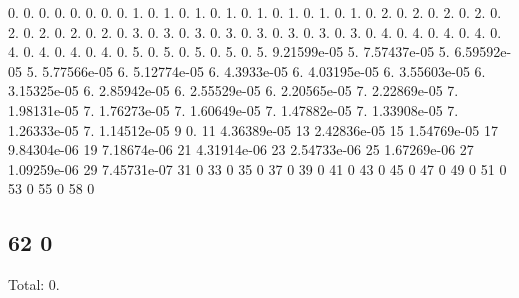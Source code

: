 0. 0. 0. 0. 0. 0. 0. 0. 1. 0. 1. 0. 1. 0. 1. 0. 1. 0. 1. 0. 1. 0. 1. 0. 2. 0. 2. 0. 2. 0. 2. 0. 2. 0. 2. 0. 2. 0. 2. 0. 3. 0. 3. 0. 3. 0. 3. 0. 3. 0. 3. 0. 3. 0. 3. 0. 4. 0. 4. 0. 4. 0. 4. 0. 4. 0. 4. 0. 4. 0. 4. 0. 5. 0. 5. 0. 5. 0. 5. 0. 5. 9.\+21599e-\/05 5. 7.\+57437e-\/05 5. 6.\+59592e-\/05 5. 5.\+77566e-\/05 6. 5.\+12774e-\/05 6. 4.\+3933e-\/05 6. 4.\+03195e-\/05 6. 3.\+55603e-\/05 6. 3.\+15325e-\/05 6. 2.\+85942e-\/05 6. 2.\+55529e-\/05 6. 2.\+20565e-\/05 7. 2.\+22869e-\/05 7. 1.\+98131e-\/05 7. 1.\+76273e-\/05 7. 1.\+60649e-\/05 7. 1.\+47882e-\/05 7. 1.\+33908e-\/05 7. 1.\+26333e-\/05 7. 1.\+14512e-\/05 9 0. 11 4.\+36389e-\/05 13 2.\+42836e-\/05 15 1.\+54769e-\/05 17 9.\+84304e-\/06 19 7.\+18674e-\/06 21 4.\+31914e-\/06 23 2.\+54733e-\/06 25 1.\+67269e-\/06 27 1.\+09259e-\/06 29 7.\+45731e-\/07 31 0 33 0 35 0 37 0 39 0 41 0 43 0 45 0 47 0 49 0 51 0 53 0 55 0 58 0 \subsection*{62 0 }

Total\+: 0. 